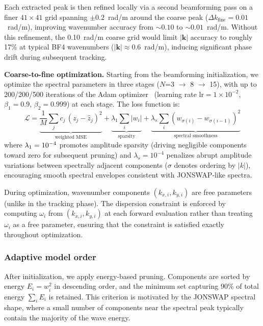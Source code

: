 \documentclass[review]{elsarticle}
\begin{document}
Each extracted peak is then refined locally via a second beamforming
pass on a finer $41\times41$ grid spanning $\pm0.2$~rad/m around
the coarse peak ($\Delta k_{\text{fine}} = 0.01$~rad/m), improving
wavenumber accuracy from $\sim0.10$ to $\sim0.01$~rad/m. Without
this refinement, the 0.10~rad/m coarse grid would limit $|\mathbf{k}|$
accuracy to roughly 17\% at typical BF4 wavenumbers
($|\mathbf{k}| \approx 0.6$~rad/m), inducing significant phase
drift during subsequent tracking.

\textbf{Coarse-to-fine optimization.}
Starting from the beamforming initialization, we optimize the
spectral parameters in three stages ($N$=3 $\to$ 8 $\to$ 15),
with up to 200/200/500 iterations of the Adam optimizer~\citep{kingma2015}
(learning rate $\text{lr} = 1 \times 10^{-2}$,
$\beta_1 = 0.9$, $\beta_2 = 0.999$) at each stage.
The loss function is:
\begin{equation}
  \mathcal{L} = \underbrace{\frac{1}{M} \sum_j c_j \, (z_j - \hat{z}_j)^2}_{\text{weighted MSE}}
    + \underbrace{\lambda_1 \sum_i |w_i|}_{\text{sparsity}}
    + \underbrace{\lambda_s \sum_i (w_{\sigma(i)} - w_{\sigma(i-1)})^2}_{\text{spectral smoothness}}
\end{equation}
where $\lambda_1 = 10^{-4}{}$ promotes amplitude sparsity (driving
negligible components toward zero for subsequent pruning) and
$\lambda_s = 10^{-4}$ penalizes abrupt amplitude variations between
spectrally adjacent components ($\sigma$ denotes ordering by $|k|$),
encouraging smooth spectral envelopes consistent with JONSWAP-like
spectra.

During optimization, wavenumber components $(k_{x,i}, k_{y,i})$
are free parameters (unlike in the tracking phase).  The dispersion
constraint is enforced by computing $\omega_i$ from $(k_{x,i}, k_{y,i})$
at each forward evaluation rather than treating $\omega_i$ as a free
parameter, ensuring that the constraint is satisfied exactly
throughout optimization.

\subsubsection{Adaptive model order}
\label{sec:adaptive_order}

After initialization, we apply energy-based pruning.
Components are sorted by energy $E_i = w_i^2$ in descending order,
and the minimum set capturing 90\% of total energy
$\sum_i E_i$ is retained.  This criterion is motivated by the
JONSWAP spectral shape, where a small number of components near the
spectral peak typically contain the majority of the wave energy.
\end{document}
